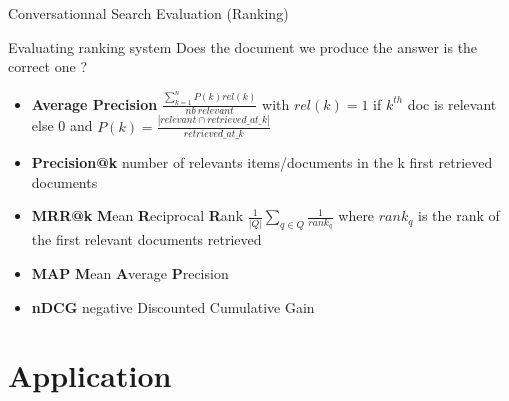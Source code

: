 \documentclass[10pt,aspectratio=169]{beamer}
\begin{document}
\begin{frame}{Conversationnal Search Evaluation (Ranking)}
    \begin{block}{Evaluating ranking system}
        Does the document we produce the answer is the correct one ? 
        \begin{itemize}
            \item \textbf{Average Precision} $\frac{\sum\limits_{k=1}^n P(k)rel(k)}{nb\ relevant}$ with $rel(k) = 1$ if $k^{th}$ doc is relevant else 0 and $P(k) = \frac{|relevant \cap retrieved\_at\_k|}{retrieved\_at\_k}$
            \item \textbf{Precision@k} number of relevants items/documents in the k first retrieved documents

            \item \textbf{MRR@k} \textbf{M}ean \textbf{R}eciprocal \textbf{R}ank $\frac{1}{|Q|} \sum \limits_{q \in Q} \frac{1}{rank_q}$ where $rank_q$ is the rank of the first relevant documents retrieved
            \item \textbf{MAP} \textbf{M}ean \textbf{A}verage \textbf{P}recision 
            \item \textbf{nDCG} negative Discounted Cumulative Gain  
        \end{itemize}
    \end{block}
\end{frame}


\section{Application}
\end{document}
